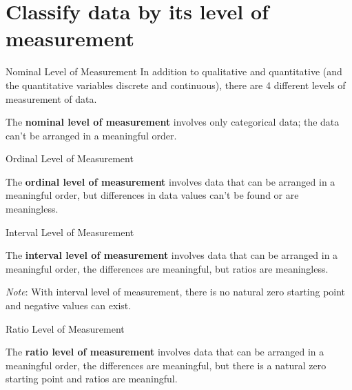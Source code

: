 \documentclass[t]{beamer}
\begin{document}
\section{Classify data by its level of measurement}

\begin{frame}{Nominal Level of Measurement}
In addition to qualitative and quantitative (and the quantitative variables discrete and continuous), there are 4 different levels of measurement of data.	\newline\\	\pause
\begin{tcolorbox}[colframe=green!20!black, colback = green!30!white,title=\textbf{Nominal Level of Data}]
The \textbf{nominal level of measurement} involves only categorical data; the data can't be arranged in a meaningful order.
\end{tcolorbox}
\end{frame}

\begin{frame}{Ordinal Level of Measurement}
\begin{tcolorbox}[colframe=green!20!black, colback = green!30!white,title=\textbf{Ordinal Level of Data}]
The \textbf{ordinal level of measurement} involves data that can be arranged in a meaningful order, but differences in data values can't be found or are meaningless.
\end{tcolorbox}
\end{frame}

\begin{frame}{Interval Level of Measurement}
\begin{tcolorbox}[colframe=green!20!black, colback = green!30!white,title=\textbf{Interval Level of Data}]
The \textbf{interval level of measurement} involves data that can be arranged in a meaningful order, the differences are meaningful, but ratios are meaningless.
\end{tcolorbox}
\vspace{10pt}	\pause
\emph{Note}: With interval level of measurement, there is no natural zero starting point and negative values can exist.
\end{frame}

\begin{frame}{Ratio Level of Measurement}
\begin{tcolorbox}[colframe=green!20!black, colback = green!30!white,title=\textbf{Ratio Level of Data}]
The \textbf{ratio level of measurement} involves data that can be arranged in a meaningful order, the differences are meaningful, but there is a natural zero starting point and ratios are meaningful.
\end{tcolorbox}
\end{frame}
\end{document}
